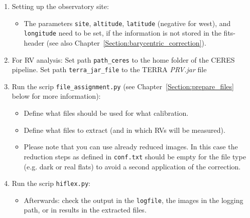 \documentclass[10pt,a4paper]{article}
\begin{document}
\begin{enumerate}
  \item Setting up the observatory site: \vspace*{-\itemsep}
  \begin{itemize}[leftmargin=*]\setlength\itemsep{0em}
    \item The parameters \verb|site|, \verb|altitude|, \verb|latitude| (negative for west), and \verb|longitude| need to be set, if the information is not stored in the fits-header (see also Chapter~\ref{Section:barycentric_correction}).
  \end{itemize}
  
  \item For RV analysis: Set path \verb|path_ceres| to the home folder of the CERES pipeline. Set path \verb|terra_jar_file| to the TERRA \textit{PRV.jar} file
  
  \item Run the scrip \verb|file_assignment.py| (see Chapter~\ref{Section:prepare_files} below for more information): \vspace*{-\itemsep}
  \begin{itemize}[leftmargin=*]\setlength\itemsep{0em}
    \item Define what files should be used for what calibration.
    \item Define what files to extract (and in which RVs will be measured).
    \item Please note that you can use already reduced images. In this case the reduction steps as defined in \verb|conf.txt| should be empty for the file type (e.g. dark or real flats) to avoid a second application of the correction.
  \end{itemize}
  
  \item Run the scrip \verb|hiflex.py|: \vspace*{-\itemsep}
  \begin{itemize}[leftmargin=*]\setlength\itemsep{0em}
    \item Afterwards: check the output in the \verb|logfile|, the images in the logging path, or in results in the extracted files.
  \end{itemize}
  
\end{enumerate}
\end{document}
